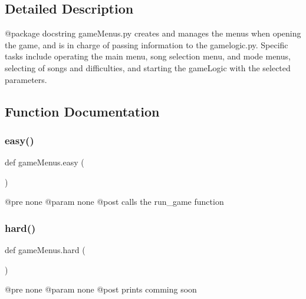 \subsection{Detailed Description}
\begin{DoxyVerb}@package docstring
   gameMenus.py creates and manages the menus when opening the game, and is in charge of passing information to the gamelogic.py.  Specific tasks include
   operating the main menu, song selection menu, and mode menus, selecting of songs and difficulties, and starting the gameLogic with the selected parameters.
\end{DoxyVerb}
 

\subsection{Function Documentation}
\mbox{\label{namespacegame_menus_a6cce73d91a8b2e724b5907be9a6dad0a}} 
\subsubsection{\texorpdfstring{easy()}{easy()}}
{\footnotesize\ttfamily def game\+Menus.\+easy (\begin{DoxyParamCaption}{ }\end{DoxyParamCaption})}

\begin{DoxyVerb}@pre none
@param none
@post calls the run_game function
\end{DoxyVerb}
 \mbox{\label{namespacegame_menus_a94bf0bd58ca97e1ea8ddc80e376f7533}} 
\subsubsection{\texorpdfstring{hard()}{hard()}}
{\footnotesize\ttfamily def game\+Menus.\+hard (\begin{DoxyParamCaption}{ }\end{DoxyParamCaption})}

\begin{DoxyVerb}@pre none
@param none
@post prints comming soon
\end{DoxyVerb}
 \mbox{\label{namespacegame_menus_a4f85966223fa1b95eb213a36fc765b82}} 
